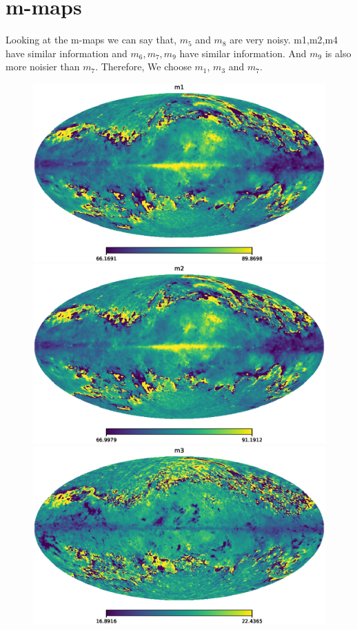 \appendix
\chapter{m-maps}
\label{mmapsappendix}
\newlength{\mwidths}
\setlength{\mwidths}{0.3\linewidth}

Looking at the m-maps we can say that, 
$m_5$ and $m_8$ are very noisy. m1,m2,m4 have similar information and
$m_6,m_7,m_9$ have similar information. And $m_9$ is also more noisier than $m_7$.
Therefore, We choose $m_1$, $m_3$ and $m_7$.

\begin{figure}[htbp]
  \centering
 \includegraphics[width=\mwidths]{m-maps/map_m1.eps}
 \includegraphics[width=\mwidths]{m-maps/map_m2.eps}
 \includegraphics[width=\mwidths]{m-maps/map_m3.eps}

\end{figure}
